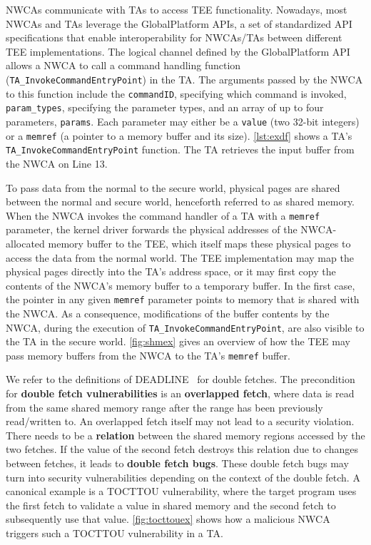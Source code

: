 \documentclass[letterpaper,twocolumn,10pt]{article}
\begin{document}
NWCAs communicate with TAs to access TEE functionality. Nowadays, most NWCAs and TAs 
leverage the GlobalPlatform APIs, a set of standardized API specifications that enable 
interoperability for NWCAs/TAs between different TEE implementations. The logical 
channel defined by the GlobalPlatform API allows a NWCA to call a command handling 
function (\texttt{TA\_InvokeCommandEntryPoint}) in the TA.  
The arguments passed by the NWCA to this function include the \texttt{commandID}, specifying 
which command is invoked, \texttt{param\_types}, specifying the parameter types, 
and an array of up to four parameters, \texttt{params}. 
Each parameter may either be a \texttt{value} (two 32-bit integers) or a 
\texttt{memref} (a pointer to a memory buffer and its size). 
\autoref{lst:exdf} shows a TA's \texttt{TA\_InvokeCommandEntryPoint} function.
The TA retrieves the input buffer from the NWCA on Line 13.

To pass data from the normal to the secure world, physical pages are shared 
between the normal and secure world, henceforth referred to as shared memory. 
When the NWCA invokes the command handler of a TA with a \texttt{memref} 
parameter, the kernel driver forwards the physical addresses of the NWCA-allocated 
memory buffer to the TEE, which itself maps these physical pages to access the data 
from the normal world. The TEE implementation may map 
the physical pages directly into the TA's address space, or it may first copy
the contents of the NWCA's memory buffer to a temporary buffer. In the first case, the 
pointer in any given \texttt{memref} parameter points to memory that is shared 
with the NWCA. As a consequence, modifications of the buffer contents by the NWCA, 
during the execution of \texttt{TA\_InvokeCommandEntryPoint}, are also visible to the 
TA in the secure world. \autoref{fig:shmex} gives an overview of how the TEE may pass 
memory buffers from the NWCA to the TA's \texttt{memref} buffer.

We refer to the definitions of \textsc{DEADLINE}~\cite{deadline} for double fetches.
The precondition for \textbf{double fetch vulnerabilities} is an \textbf{overlapped fetch}, where data 
is read from the same shared memory range after the range has been previously read/written to. 
An overlapped fetch itself may not lead to a security violation. There needs to be a \textbf{relation}
between the shared memory regions accessed by the two fetches. If the value of the second fetch 
destroys this relation due to changes between fetches, it leads to \textbf{double fetch bugs}.  
These double fetch bugs may turn into security vulnerabilities depending on the context of the 
double fetch. A canonical example is a TOCTTOU vulnerability, where the target program uses the 
first fetch to validate a value in shared memory and the second fetch to subsequently use that value. 
\autoref{fig:tocttouex} shows how a malicious NWCA triggers such a TOCTTOU vulnerability in a TA. 
\end{document}
